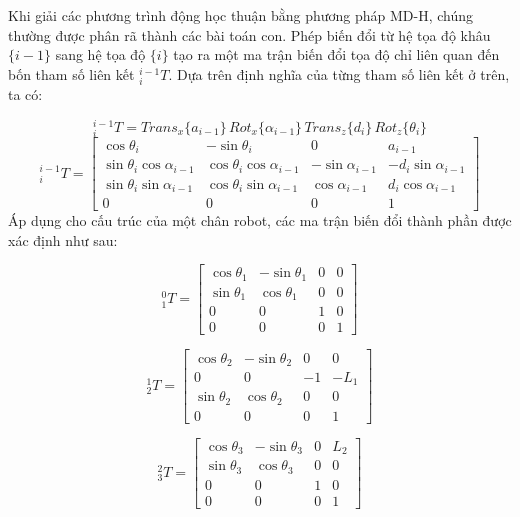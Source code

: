 Khi giải các phương trình động học thuận bằng phương pháp MD-H, chúng thường được 
phân rã thành các bài toán con. Phép biến đổi từ hệ tọa độ khâu $\{i-1\}$ sang hệ 
tọa độ $\{i\}$ tạo ra một ma trận biến đổi tọa độ chỉ liên quan đến bốn tham số 
liên kết $^{i-1}_{i}T$. Dựa trên định nghĩa của từng tham số liên kết ở trên, ta có:

\begin{equation}
^{i-1}_{i}T = Trans_x\{a_{i-1}\} \, Rot_x\{\alpha_{i-1}\} \, Trans_z\{d_i\} \, Rot_z\{\theta_i\}
\end{equation}
\begin{equation}
{}^{i-1}_{i}T=
\begin{bmatrix}
\cos\theta_i & -\sin\theta_i & 0 & a_{i-1} \\
\sin\theta_i\cos\alpha_{i-1} & \cos\theta_i\cos\alpha_{i-1} & -\sin\alpha_{i-1} & -d_i\sin\alpha_{i-1} \\
\sin\theta_i\sin\alpha_{i-1} & \cos\theta_i\sin\alpha_{i-1} & \cos\alpha_{i-1} & d_i\cos\alpha_{i-1} \\
0 & 0 & 0 & 1
\end{bmatrix}
\end{equation}
Áp dụng cho cấu trúc của một chân robot, các ma trận biến đổi thành phần được xác định như sau:

\begin{equation}
{}^{0}_{1}T=
\begin{bmatrix}
\cos\theta_1 & -\sin\theta_1 & 0 & 0 \\
\sin\theta_1 & \cos\theta_1 & 0 & 0 \\
0 & 0 & 1 & 0 \\
0 & 0 & 0 & 1
\end{bmatrix}
\end{equation}

\begin{equation}
{}^{1}_{2}T=
\begin{bmatrix}
\cos\theta_2 & -\sin\theta_2 & 0 & 0 \\
0 & 0 & -1 & -L_1 \\
\sin\theta_2 & \cos\theta_2 & 0 & 0 \\
0 & 0 & 0 & 1
\end{bmatrix}
\end{equation}

\begin{equation}
{}^{2}_{3}T=
\begin{bmatrix}
\cos\theta_3 & -\sin\theta_3 & 0 & L_2 \\
\sin\theta_3 & \cos\theta_3 & 0 & 0 \\
0 & 0 & 1 & 0 \\
0 & 0 & 0 & 1
\end{bmatrix}
\end{equation}

